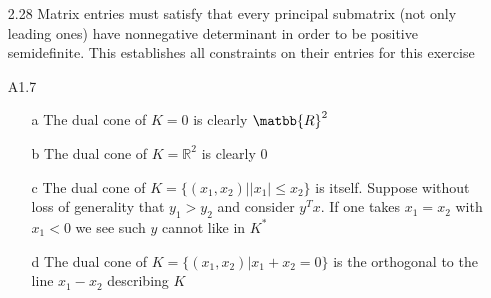 \documentclass[12pt]{article}
\begin{document}
\begin{itemize}
\item[2.28]
  Matrix entries must satisfy that every principal submatrix (not only leading ones) have nonnegative determinant in order to be positive semidefinite. This establishes all constraints on their entries for this exercise

\item[A1.7]
  \begin{itemize}
  \item[a] The dual cone of $K = {0}$ is clearly $\matbb{R}^2$
  \item[b] The dual cone of $K = \mathbb{R}^2$ is clearly ${0}$
  \item[c] The dual cone of $K = \{(x_1, x_2) | |x_1| \leq x_2 \}$ is itself. Suppose without loss of generality that $y_1 > y_2$ and consider $y^T x$. If one takes $x_1 = x_2$ with $x_1 < 0$ we see such $y$ cannot like in $K^*$
    \item[d] The dual cone of $K = \{(x_1,x_2) | x_1 + x_2 = 0\}$ is the orthogonal to the line $x_1 - x_2$ describing $K$
  \end{itemize}
\end{itemize}
\end{document}
